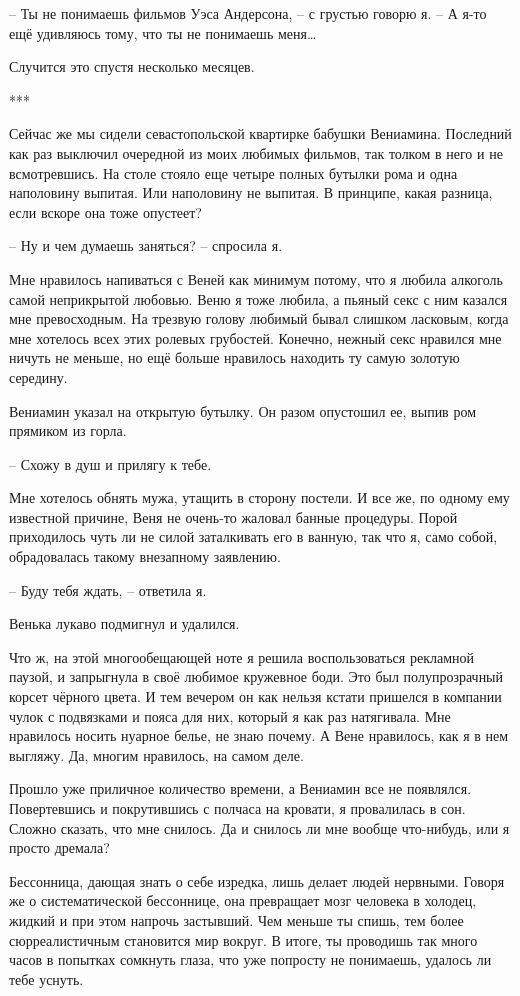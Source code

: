 \documentclass[
]{book}
\begin{document}
-- Ты не понимаешь фильмов Уэса Андерсона, -- с грустью говорю я. -- А я-то ещё удивляюсь тому, что ты не понимаешь меня\ldots{}

Случится это спустя несколько месяцев.

***

Сейчас же мы сидели севастопольской квартирке бабушки Вениамина. Последний как раз выключил очередной из моих любимых фильмов, так толком в него и не всмотревшись. На столе стояло еще четыре полных бутылки рома и одна наполовину выпитая. Или наполовину не выпитая. В принципе, какая разница, если вскоре она тоже опустеет?

-- Ну и чем думаешь заняться? -- спросила я.

Мне нравилось напиваться с Веней как минимум потому, что я любила алкоголь самой неприкрытой любовью. Веню я тоже любила, а пьяный секс с ним казался мне превосходным. На трезвую голову любимый бывал слишком ласковым, когда мне хотелось всех этих ролевых грубостей. Конечно, нежный секс нравился мне ничуть не меньше, но ещё больше нравилось находить ту самую золотую середину.

Вениамин указал на открытую бутылку. Он разом опустошил ее, выпив ром прямиком из горла.

-- Схожу в душ и прилягу к тебе.

Мне хотелось обнять мужа, утащить в сторону постели. И все же, по одному ему известной причине, Веня не очень-то жаловал банные процедуры. Порой приходилось чуть ли не силой заталкивать его в ванную, так что я, само собой, обрадовалась такому внезапному заявлению.

-- Буду тебя ждать, -- ответила я.

Венька лукаво подмигнул и удалился.

Что ж, на этой многообещающей ноте я решила воспользоваться рекламной паузой, и запрыгнула в своё любимое кружевное боди. Это был полупрозрачный корсет чёрного цвета. И тем вечером он как нельзя кстати пришелся в компании чулок с подвязками и пояса для них, который я как раз натягивала. Мне нравилось носить нуарное белье, не знаю почему. А Вене нравилось, как я в нем выгляжу. Да, многим нравилось, на самом деле.

Прошло уже приличное количество времени, а Вениамин все не появлялся. Повертевшись и покрутившись с полчаса на кровати, я провалилась в сон. Сложно сказать, что мне снилось. Да и снилось ли мне вообще что-нибудь, или я просто дремала?

Бессонница, дающая знать о себе изредка, лишь делает людей нервными. Говоря же о систематической бессоннице, она превращает мозг человека в холодец, жидкий и при этом напрочь застывший. Чем меньше ты спишь, тем более сюрреалистичным становится мир вокруг. В итоге, ты проводишь так много часов в попытках сомкнуть глаза, что уже попросту не понимаешь, удалось ли тебе уснуть.
\end{document}
